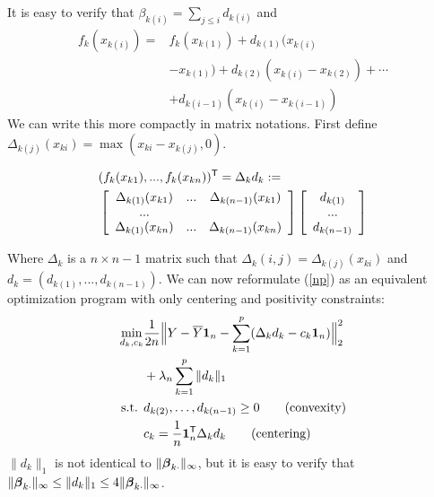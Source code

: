 It is easy to verify that $\beta_{k(i)} = \sum_{j \leq i} d_{k(i)}$ and 
\begin{equation}
\begin{split}
f_k(x_{k(i)}) = & f_k({x_{k(1)}}) +d_{k(1)} ( x_{k(i)} \\
& - x_{k(1)}) + d_{k(2)} ( x_{k(i)} - x_{k(2)}) + \cdots  \\
& + d_{k(i-1)} ( x_{k(i)} - x_{k(i-1)})
\end{split}
\end{equation}
We can write this more compactly in matrix notations. First define $\Delta_{k(j)}(x_{ki}) = \max( x_{ki} - x_{k(j)}, 0)$. 


\begin{equation*}
\begin{split}
&(f_k(x_{k1}) ,..., f_k(x_{kn}))^\tran = \Delta_k d_k \coloneqq \\
\vspace{0.1in}
&\left[ \begin{array}{ccc}
    \Delta_{k(1)}(x_{k1}) & ... & \Delta_{k(n-1)}(x_{k1}) \\
    ... & & \\
    \Delta_{k(1)}(x_{kn}) & ... & \Delta_{k(n-1)}(x_{kn}) 
\end{array} \right]
\left[ \begin{array}{c}
    d_{k(1)} \\
    ... \\
    d_{k(n-1)}
\end{array} \right] 
\end{split}
\end{equation*}

Where $\Delta_k$ is a $n\times n-1$ matrix such that $\Delta_k(i,j) = \Delta_{k(j)}(x_{ki})$ and $d_k = (d_{k(1)} ,..., d_{k(n-1)})$. We can now reformulate (\ref{np}) as an equivalent optimization program with only centering and positivity constraints:
\begin{align}
\min_{d_k, c_k}& \frac{1}{2n} 
       \Bigl\| Y - \overline{Y}\mbox{\boldmath $1$}_n - \sum_{k=1}^p 
             ( \Delta_k d_k - c_k \mbox{\boldmath $1$}_n) \Bigr\|_2^2 \nonumber \\
               & + \lambda_n \sum_{k=1}^p \|d_k\|_1   \label{opt:alternate_opt} \\
\textrm{s.t. }  & d_{k(2)}, \ldots , d_{k(n-1)} \geq 0  	
               \qquad \textrm{(convexity)} \nonumber \\ 
	& c_k = \frac{1}{n} \mbox{\boldmath $1$}_n^{\mathsf{T}} \Delta_k d_k 	
               \qquad \textrm{(centering)} \nonumber 
\end{align}
$\|d_k\|_1$ is not identical to $\|\boldsymbol{\beta}_{k\cdot}\|_{\infty}$, but it is easy to verify that $\|\boldsymbol{\beta}_{k\cdot}\|_{\infty} \leq \|d_k\|_1 \leq 4\|\boldsymbol{\beta}_{k\cdot}\|_{\infty}$.

